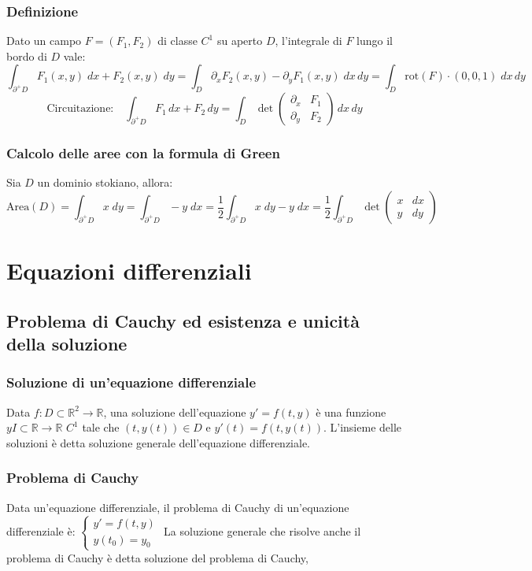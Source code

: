 \documentclass[a4paper]{article}
\newcommand\R{\mathbb{R}}     %
\newcommand\Rd{\mathbb{R}^2}  %
\newcommand\rot{\text{rot}}   %
\begin{document}
\subsubsection*{Definizione}
Dato un campo \(F = (F_1, F_2)\) di classe \(C^1\) su aperto \(D\), l'integrale di \(F\) lungo il bordo di \(D\) vale:
\[\int_{\partial^+D} F_1(x,y) \; dx + F_2(x,y) \; dy = \int_D \partial_x F_2(x,y) - \partial_y F_1(x,y) \; dx \, dy = \int_D \rot(F) \cdot (0,0,1) \; dx \, dy\]
\[\text{Circuitazione:} \quad \int_{\partial^+D} F_1 \, dx + F_2 \, dy = \int_D \det \left(\begin{matrix} \partial_x & F_1 \\ \partial_y & F_2 \end{matrix}\right) \, dx \, dy\]

\subsubsection*{Calcolo delle aree con la formula di Green}
Sia \(D\) un dominio stokiano, allora:
\[\text{Area}(D) = \int_{\partial^+D} x \; dy = \int_{\partial^+D} -y \; dx = \frac{1}{2} \int_{\partial^+D} x \; dy - y \; dx =
\frac{1}{2} \int_{\partial^+D} \det \left(\begin{matrix} x & dx \\ y & dy \end{matrix}\right)\]

\newpage


\section{Equazioni differenziali}
\subsection{Problema di Cauchy ed esistenza e unicità della soluzione}
\subsubsection*{Soluzione di un'equazione differenziale}
Data \(f:D \subset \Rd \to \R\), una soluzione dell'equazione \(y' = f(t,y)\) è una funzione \(y I \subset \R \to \R\) \(C^1\) tale che
\((t,y(t)) \in D\) e \(y'(t) = f(t, y(t))\). L'insieme delle soluzioni è detta soluzione generale dell'equazione differenziale.

\subsubsection*{Problema di Cauchy}
Data un'equazione differenziale, il problema di Cauchy di un'equazione differenziale è:
\(\begin{cases}
	y' = f(t,y) \\
	y(t_0) = y_0
\end{cases}\)
La soluzione generale che risolve anche il problema di Cauchy è detta soluzione del problema di Cauchy,
\end{document}
